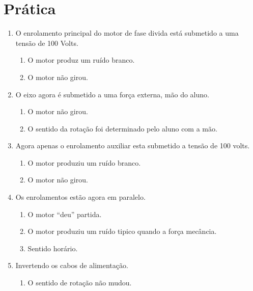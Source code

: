 \documentclass[paper=a4, fontsize=11pt]{article}
\begin{document}
\section{Prática}

\begin{enumerate}
    \item O enrolamento principal do motor de fase divida está submetido 
            a uma tensão de 100 Volts. 
            \begin{enumerate}
                \item O motor produz um ruído branco.
                \item O motor não girou.
            \end{enumerate}

    \item O eixo agora é submetido a uma força externa, mão do aluno.
            \begin{enumerate}
                    \item O motor não girou.
                    \item O sentido da rotação foi determinado pelo aluno com a mão.
            \end{enumerate}

    \item Agora apenas o enrolamento auxiliar esta submetido a tensão de 100 volts.
            \begin{enumerate}
        \item O motor produziu um ruído branco.
        \item O motor não girou.
            \end{enumerate}

    \item Os enrolamentos estão agora em paralelo.
            \begin{enumerate}
                    \item O motor ``deu'' partida.
                    \item O motor produziu um ruído tipico quando a força mecância.
                    \item Sentido horário.
            \end{enumerate}

    \item Invertendo os cabos de alimentação.
        \begin{enumerate}
            \item O sentido de rotação não mudou.
        \end{enumerate}


\end{enumerate}
\end{document}
